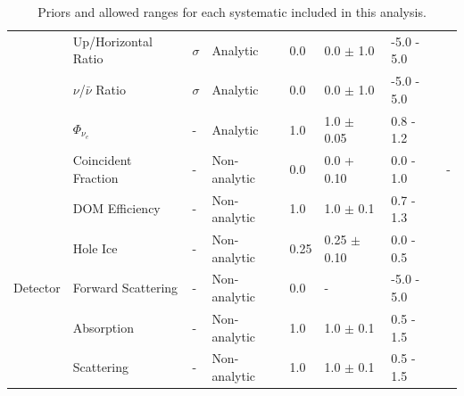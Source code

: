 \begin{landscape}
\begin{table}[]
\begin{tabular}{@{}llllllll@{}}
                               & Up/Horizontal Ratio               & $\sigma$                & Analytic   & 0.0                     & 0.0 $\pm$ 1.0   & -5.0 - 5.0    & \cite{NuFlux-Barr}              \\
                               & $\nu$/$\bar{\nu}$ Ratio       & $\sigma$               & Analytic   & 0.0                     & 0.0 $\pm$ 1.0   & -5.0 - 5.0    & \cite{NuFlux-Barr}             \\
                               & $\Phi_{\nu_e}$                    & -                             & Analytic   & 1.0                     & 1.0 $\pm$ 0.05 & 0.8 - 1.2     & \cite{NuFlux-Barr}              \\
                               & Coincident Fraction                & -                            & Non-analytic & 0.0                     & 0.0 + 0.10        & 0.0 - 1.0     & -                                       \\ \midrule
\multirow{5}{*}{Detector}      & DOM Efficiency        & -                             & Non-analytic & 1.0                     & 1.0 $\pm$ 0.1  & 0.7 - 1.3     & \cite{IceCube-SpiceMie,Thesis-Feintzeig}           \\
                               & Hole Ice                                & -                            & Non-analytic & 0.25                    & 0.25 $\pm$ 0.10 & 0.0 - 0.5  & \cite{IceCube-Oscillation2018}                 \\
                               & Forward Scattering                 & -                            & Non-analytic & 0.0                     & -                        & -5.0 - 5.0    & \cite{IceCube-Oscillation2018}                 \\
                               & Absorption                            & -                            & Non-analytic & 1.0                     & 1.0 $\pm$ 0.1   & 0.5 - 1.5     & \cite{IceCube-SpiceMie}          \\
                               & Scattering                             & -                            & Non-analytic & 1.0                     & 1.0 $\pm$ 0.1   & 0.5 - 1.5     & \cite{IceCube-SpiceMie}         \\ \bottomrule
\end{tabular}
\caption{Priors and allowed ranges for each systematic included in this analysis.}
\label{tab:priors}
\end{table}
\end{landscape}






